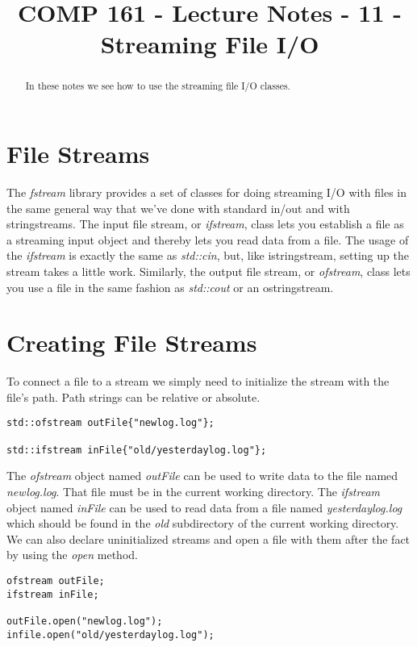 \documentclass[]{tufte-handout}
\title{COMP 161 - Lecture Notes - 11 - Streaming File I/O}
\begin{document}
 
\maketitle

\begin{abstract}
In these notes we see how to use the streaming file I/O classes. 
\end{abstract}

\section{File Streams}

The \textit{fstream} library provides a set of classes for doing streaming I/O with files in the same general way that we've done with standard in/out and with stringstreams. The input file stream, or \textit{ifstream}, class lets you establish a file as a streaming input object and thereby lets you read data from a file.  The usage of the \textit{ifstream} is exactly the same as \textit{std::cin}, but, like istringstream, setting up the stream takes a little work. Similarly, the output file stream, or \textit{ofstream}, class lets you use a file in the same fashion as \textit{std::cout} or an ostringstream.

\section{Creating File Streams}

To connect a file to a stream we simply need to initialize the stream with the file's path. Path strings can be relative or absolute.
\begin{verbatim}
std::ofstream outFile{"newlog.log"};

std::ifstream inFile{"old/yesterdaylog.log"};
\end{verbatim}
The \textit{ofstream} object named \textit{outFile} can be used to write data to the file named \textit{newlog.log}.  That file must be in the current working directory. The \textit{ifstream} object named \textit{inFile} can be used to read data from a file named \textit{yesterdaylog.log} which should be found in the \textit{old} subdirectory of the current working directory. We can also declare uninitialized streams and open a file with them after the fact by using the \textit{open } method.
\begin{verbatim}
ofstream outFile;
ifstream inFile;

outFile.open("newlog.log");
infile.open("old/yesterdaylog.log");
\end{verbatim}
\end{document}

